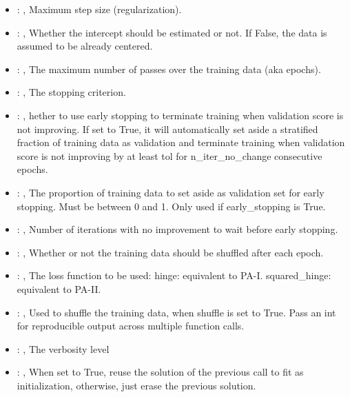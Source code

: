 \begin{itemize}
    \item {}: , 
      Maximum step size (regularization).

    \item {}: , 
      Whether the intercept should be estimated or not. If False,
      the data is assumed to be already centered.

    \item {}: , 
      The maximum number of passes over the training data (aka epochs).

    \item {}: , 
      The stopping criterion.

    \item {}: , 
      hether to use early stopping to terminate training when validation score is not
      improving. If set to True, it will automatically set aside a stratified fraction of training
      data as validation and terminate training when validation score is not improving by at least
      tol for n\_iter\_no\_change consecutive epochs.

    \item {}: , 
      The proportion of training data to set aside as validation set for early stopping.
      Must be between 0 and 1. Only used if early\_stopping is True.

    \item {}: , 
      Number of iterations with no improvement to wait before early stopping.

    \item {}: , 
      Whether or not the training data should be shuffled after each epoch.

    \item {}: , 
      The loss function to be used: hinge: equivalent to PA-I.
      squared\_hinge: equivalent to PA-II.

    \item {}: , 
      Used to shuffle the training data, when shuffle is set to
      True. Pass an int for reproducible output across multiple function calls.

    \item {}: , 
      The verbosity level

    \item {}: , 
      When set to True, reuse the solution of the previous call
      to fit as initialization, otherwise, just erase the previous solution.
  \end{itemize}


